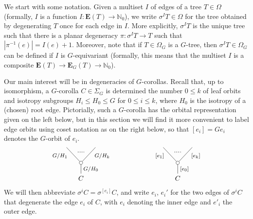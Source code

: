 \documentclass[a4paper,10pt
,draft
]{article}%
\renewcommand{\1}{\eta}%
\begin{document}
We start with some notation. 
Given a multiset $I$ of edges of a tree $T \in \Omega$
(formally, $I$ is a function 
$I \colon \boldsymbol{E}(T) \to \mathbb{N}_0$),
we write $\sigma^I T \in \Omega$
for the tree obtained by degenerating $T$ once for each edge in $I$.
More explicitly, $\sigma^I T$ is the unique tree such that there is a planar degeneracy
$\pi \colon \sigma^I T \to T$
such that $|\pi^{-1}(e)| = I(e) + 1$.
Moreover,
note that if $T\in \Omega_G$ is a $G$-tree, 
then $\sigma^{I} T \in \Omega_{G}$
can be defined if $I$ is $G$-equivariant
(formally, this means that the multiset $I$ is a composite
$\boldsymbol{E}(T) \to \boldsymbol{E}_G(T)
\to \mathbb{N}_0$).

Our main interest will be in degeneracies of $G$-corollas. Recall that, up to isomorphism, 
a $G$-corolla $C \in \Sigma_G$ is determined the number $0 \leq k$ of leaf orbits
and isotropy subgroups
$H_i \leq H_0 \leq G$ for $0 \leq i \leq k$,
where $H_0$ is the isotropy of a (chosen) root edge.
Pictorially, such a $G$-corolla has the orbital representation given on the left below,
but in this section we will find it more convenient to label edge orbits using coset notation as on the right below,
so that $[e_i] = G e_i$ denotes the $G$-orbit of $e_i$.
\[
\begin{tikzpicture}
[grow=up,auto,level distance=2.3em,every node/.style = {font=\footnotesize},dummy/.style={circle,draw,inner sep=0pt,minimum size=1.75mm}]
	\node at (0,0) [font=\normalsize]{$C$}
		child{node [dummy] {}
			child{
			edge from parent node [swap,near end] {$G/H_k$} node [name=Kn] {}}
			child{
			edge from parent node [near end] {$G/H_1$}
node [name=Kone,swap] {}}
		edge from parent node [swap] {$G/H_0$}
		};
		\draw [dotted,thick] (Kone) -- (Kn) ;
	\node at (5,0) [font=\normalsize]{$C$}
		child{node [dummy] {}
			child{
			edge from parent node [swap,near end] {$[e_k]$} node [name=Kn] {}}
			child{
			edge from parent node [near end] {$[e_1]$}
node [name=Kone,swap] {}}
		edge from parent node [swap] {$[e_0]$}
		};
		\draw [dotted,thick] (Kone) -- (Kn) ;
\end{tikzpicture}
\]
We will then abbreviate $\sigma^i C = \sigma^{[e_i]} C$, and write $e_i$, $e_i'$ for the two edges of $\sigma^i C $ that degenerate the edge $e_i$ of $C$,
with $e_i$ denoting the inner edge and $e'_i$ the outer
edge.
\end{document}
